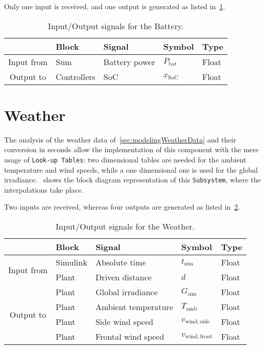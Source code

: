 Only one input is received, and one output is generated as listed in~\cref{tab:simInOutBattery}.
\begin{table}[htbp]
	\centering
	\caption{Input/Output signals for the Battery.}
	\label{tab:simInOutBattery}
	
	\begin{tabular}{c l l l l}
		\toprule
		& Block & Signal & Symbol & Type \\ 
		\midrule
		\multirow{1}{*}{Input from}
		& Sum & Battery power & $P_\mathrm{bat}$ & Float \\
		\midrule
		\multirow{1}{*}{Output to}
		& Controllers & SoC & $x_\mathrm{SoC}$ & Float \\
		\bottomrule
	\end{tabular}
\end{table}

\newpage
\section{Weather}
\label{sec:simWeather}
The analysis of the weather data of~\cref{sec:modelingWeatherData} and their conversion in seconds allow the implementation of this component with the mere usage of \texttt{Look-up Tables}: two dimensional tables are needed for the ambient temperature and wind speeds, while a one dimensional one is used for the global irradiance.~ shows the block diagram representation of this \texttt{Subsystem}, where the interpolations take place.

Two inputs are received, whereas four outputs are generated as listed in~\cref{tab:simInOutWeather}.
\begin{table}[htbp]
	\centering
	\caption{Input/Output signals for the Weather.}
	\label{tab:simInOutWeather}
	
	\begin{tabular}{c l l l l}
		\toprule
		& Block & Signal & Symbol & Type \\ 
		\midrule
		\multirow{2}{*}{Input from}
		& Simulink & Absolute time & $t_\mathrm{sim}$ & Float \\
		& Plant & Driven distance & $d$ & Float \\
		\midrule
		\multirow{4}{*}{Output to}
		& Plant & Global irradiance & $G_\mathrm{sim}$ & Float \\
		& Plant & Ambient temperature & $T_\mathrm{amb}$ & Float \\
		& Plant & Side wind speed & $v_\mathrm{wind,side}$ & Float \\
		& Plant & Frontal wind speed & $v_\mathrm{wind,front}$ & Float \\
		\bottomrule
	\end{tabular}
\end{table}

